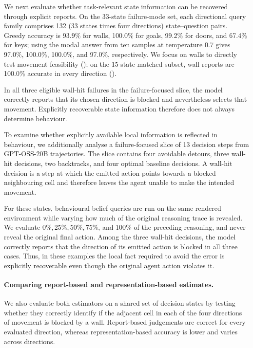 \documentclass{article}
\begin{document}
We next evaluate whether task-relevant state information can be recovered through explicit reports. On the 33-state failure-mode set, each directional query family comprises 132 (33 states times four directions) state--question pairs. Greedy accuracy is 93.9\% for walls, 100.0\% for goals, 99.2\% for doors, and 67.4\% for keys; using the modal answer from ten samples at temperature 0.7 gives 97.0\%, 100.0\%, 100.0\%, and 97.0\%, respectively. We focus on walls to directly test movement feasibility (); on the 15-state matched subset, wall reports are 100.0\% accurate in every direction ().

In all three eligible wall-hit failures in the failure-focused slice, the model correctly reports that its chosen direction is blocked and nevertheless selects that movement. Explicitly recoverable state information therefore does not always determine behaviour.

To examine whether explicitly available local information is reflected in behaviour, we additionally analyse a failure-focused slice of 13 decision steps from GPT-OSS-20B trajectories. The slice contains four avoidable detours, three wall-hit decisions, two backtracks, and four optimal baseline decisions. A wall-hit decision is a step at which the emitted action points towards a blocked neighbouring cell and therefore leaves the agent unable to make the intended movement.

For these states, behavioural belief queries are run on the same rendered environment while varying how much of the original reasoning trace is revealed. We evaluate \(0\%,25\%,50\%,75\%\), and \(100\%\) of the preceding reasoning, and never reveal the original final action. Among the three wall-hit decisions, the model correctly reports that the direction of its emitted action is blocked in all three cases. Thus, in these examples the local fact required to avoid the error is explicitly recoverable even though the original agent action violates it.


\paragraph{Comparing report-based and representation-based estimates.}
We also evaluate both estimators on a shared set of decision states by testing whether they correctly identify if the adjacent cell in each of the four directions of movement is blocked by a wall. 
Report-based judgements are correct for every evaluated direction, whereas representation-based accuracy is lower and varies across directions.
\end{document}
